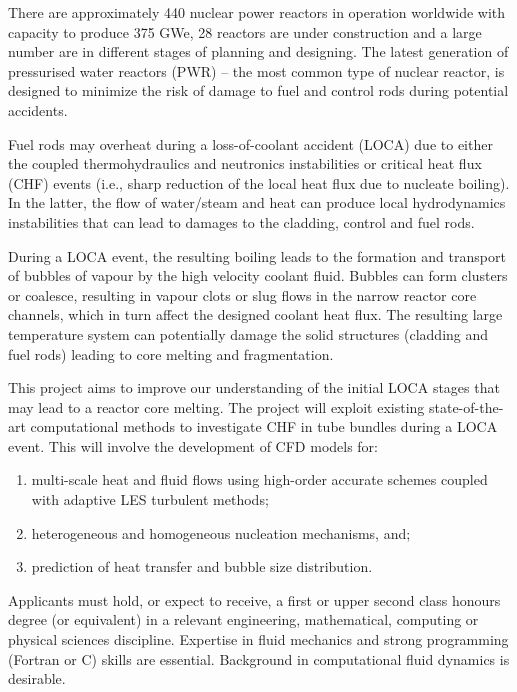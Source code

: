 \documentclass[12pts,a4paper,amsmath,amssymb,floatfix]{article}%
\begin{document}
\begin{enumerate}[label=\bfseries Project: \arabic*:]
  There are approximately 440 nuclear power reactors in operation worldwide with capacity to produce 375 GWe, 28 reactors are under construction and a large number are in different stages of planning and designing. The latest generation of pressurised water reactors (PWR) -- the most common type of nuclear reactor, is designed to minimize the risk of damage to fuel and control rods during potential accidents.

  Fuel rods may overheat during a loss-of-coolant accident (LOCA) due to either the coupled thermohydraulics and neutronics instabilities or critical heat flux (CHF) events (i.e., sharp reduction of the local heat flux due to nucleate boiling). In the latter, the flow of water/steam and heat can produce local hydrodynamics instabilities that can lead to damages to the cladding, control and fuel rods.

  During a LOCA event, the resulting boiling leads to the formation and transport of bubbles of vapour by the high velocity coolant fluid. Bubbles can form clusters or coalesce, resulting in vapour clots or slug flows in the narrow reactor core channels, which in turn affect the designed coolant heat flux. The resulting large temperature system can potentially damage the solid structures (cladding and fuel rods) leading to core melting and fragmentation.
  
  This project aims to improve our understanding of the initial LOCA stages that may lead to a reactor core melting. The project will exploit existing state-of-the-art computational methods to investigate CHF in tube bundles during a LOCA event. This will involve the development of CFD models for:
  \begin{enumerate}%
    \item multi-scale heat and fluid flows using high-order accurate schemes coupled with adaptive LES turbulent methods;
    \item heterogeneous and homogeneous nucleation mechanisms, and;
    \item prediction of heat transfer and bubble size distribution.
  \end{enumerate}
  
  Applicants must hold, or expect to receive, a first or upper second class honours degree (or equivalent) in a relevant engineering, mathematical, computing or physical sciences discipline. Expertise in fluid mechanics and strong programming (Fortran or C) skills are essential. Background in computational fluid dynamics is desirable.
  

\end{enumerate}
\end{document}

